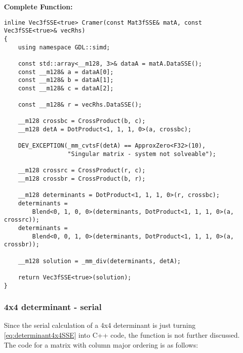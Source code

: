 \vspace{1cm}
\textbf{Complete Function:}

\begin{verbatim}
inline Vec3fSSE<true> Cramer(const Mat3fSSE& matA, const Vec3fSSE<true>& vecRhs)
{
    using namespace GDL::simd;

    const std::array<__m128, 3>& dataA = matA.DataSSE();
    const __m128& a = dataA[0];
    const __m128& b = dataA[1];
    const __m128& c = dataA[2];

    const __m128& r = vecRhs.DataSSE();

    __m128 crossbc = CrossProduct(b, c);
    __m128 detA = DotProduct<1, 1, 1, 0>(a, crossbc);

    DEV_EXCEPTION(_mm_cvtsF(detA) == ApproxZero<F32>(10), 
                  "Singular matrix - system not solveable");

    __m128 crossrc = CrossProduct(r, c);
    __m128 crossbr = CrossProduct(b, r);

    __m128 determinants = DotProduct<1, 1, 1, 0>(r, crossbc);
    determinants = 
        Blend<0, 1, 0, 0>(determinants, DotProduct<1, 1, 1, 0>(a, crossrc));
    determinants = 
        Blend<0, 0, 1, 0>(determinants, DotProduct<1, 1, 1, 0>(a, crossbr));

    __m128 solution = _mm_div(determinants, detA);

    return Vec3fSSE<true>(solution);
}
\end{verbatim}




\newpage
\subsubsection{4x4 determinant - serial}
\label{sec:determinant4x4Serial}

Since the serial calculation of a 4x4 determinant is just turning \cref{eq:determinant4x4SSE} into C++ code, the function is not further discussed.
The code for a matrix with column major ordering is as follows:

